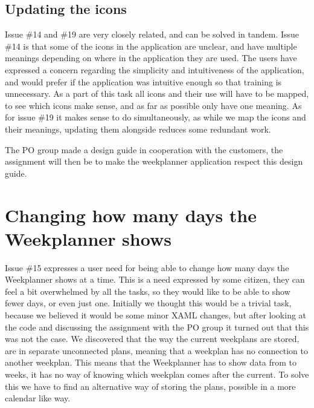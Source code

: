 \subsection{Updating the icons}
Issue \#14 and \#19 are very closely related, and can be solved in tandem. Issue \#14 is that some of the icons in the application are unclear, and have multiple meanings depending on where in the application they are used. The users have expressed a concern regarding the simplicity and intuitiveness of the application, and would prefer if the application was intuitive enough so that training is unnecessary.
As a part of this task all icons and their use will have to be mapped, to see which icons make sense, and as far as possible only have one meaning. As for issue \#19 it makes sense to do simultaneously, as while we map the icons and their meanings, updating them alongside reduces some redundant work. 

The \gls{PO} group made a design guide in cooperation with the customers, the assignment will then be to make the weekplanner application respect this design guide.

\section{Changing how many days the Weekplanner shows}\label{sec:weekPlannerDaysToShow}

Issue \#15 expresses a user need for being able to change how many days the Weekplanner shows at a time. This is a need expressed by some citizen, they can feel a bit overwhelmed by all the tasks, so they would like to be able to show fewer days, or even just one.
Initially we thought this would be a trivial task, because we believed it would be some minor \gls{XAML} changes, but after looking at the code and discussing the assignment with the \gls{PO} group it turned out that this was not the case. We discovered that the way the current weekplans are stored, are in separate unconnected plans, meaning that a weekplan has no connection to another weekplan. This means that the Weekplanner has to show data from to weeks, it has no way of knowing which weekplan comes after the current.
To solve this we have to find an alternative way of storing the plans, possible in a more calendar like way.





